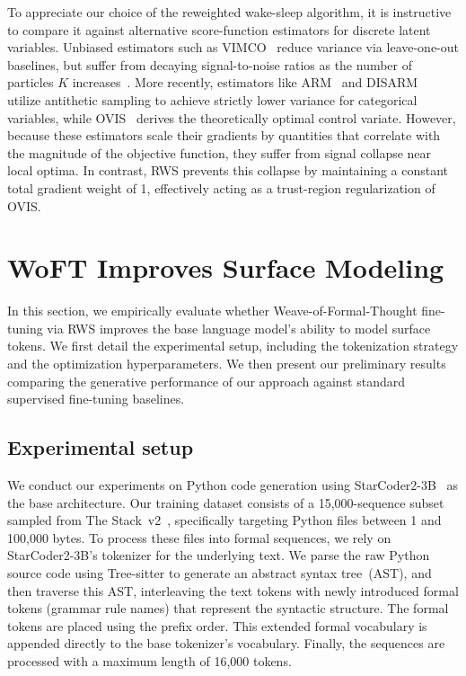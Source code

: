 \documentclass[11pt]{article}
\theoremstyle{plain}
\theoremstyle{definition}
\begin{document}
To appreciate our choice of the reweighted wake-sleep algorithm, it is
instructive to compare it against alternative score-function estimators for
discrete latent variables. Unbiased estimators such as VIMCO~\cite{vimco-2016}
reduce variance via leave-one-out baselines, but suffer from decaying
signal-to-noise ratios as the number of particles \( K \)
increases~\cite{rainforth-2018}. More recently, estimators like
ARM~\cite{arm-2019} and DISARM~\cite{disarm-2020} utilize antithetic sampling to
achieve strictly lower variance for categorical variables, while
OVIS~\cite{ovis-2020} derives the theoretically optimal control variate.
However, because these estimators scale their gradients by quantities that
correlate with the magnitude of the objective function, they suffer from signal
collapse near local optima. In contrast, RWS prevents this collapse by
maintaining a constant total gradient weight of 1, effectively acting as a
trust-region regularization of OVIS.

\section{WoFT Improves Surface Modeling}
\label{sec:experiments}

In this section, we empirically evaluate whether Weave-of-Formal-Thought
fine-tuning via RWS improves the base language model's ability to model surface
tokens. We first detail the experimental setup, including the tokenization
strategy and the optimization hyperparameters. We then present our preliminary
results comparing the generative performance of our approach against standard
supervised fine-tuning baselines.

\subsection{Experimental setup}

We conduct our experiments on Python code generation using
StarCoder2-3B~\cite{starcoder2-2024} as the base architecture. Our training
dataset consists of a 15,000-sequence subset sampled from The
Stack~v2~\cite{starcoder2-2024}, specifically targeting Python files between 1
and 100,000 bytes. To process these files into formal sequences, we rely on
StarCoder2-3B's tokenizer for the underlying text. We parse the raw Python
source code using Tree-sitter to generate an abstract syntax tree~(AST), and
then traverse this AST, interleaving the text tokens with newly introduced
formal tokens (grammar rule names) that represent the syntactic structure. The
formal tokens are placed using the prefix order. This extended formal vocabulary
is appended directly to the base tokenizer's vocabulary. Finally, the sequences
are processed with a maximum length of 16,000 tokens.
\end{document}
